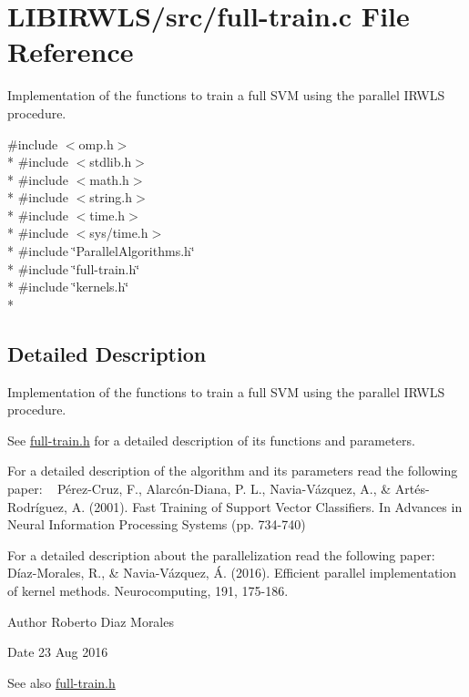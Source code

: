 \hypertarget{full-train_8c}{}\section{L\+I\+B\+I\+R\+W\+L\+S/src/full-\/train.c File Reference}
\label{full-train_8c}


Implementation of the functions to train a full S\+VM using the parallel I\+R\+W\+LS procedure.  


{\ttfamily \#include $<$omp.\+h$>$}\\*
{\ttfamily \#include $<$stdlib.\+h$>$}\\*
{\ttfamily \#include $<$math.\+h$>$}\\*
{\ttfamily \#include $<$string.\+h$>$}\\*
{\ttfamily \#include $<$time.\+h$>$}\\*
{\ttfamily \#include $<$sys/time.\+h$>$}\\*
{\ttfamily \#include \char`\"{}Parallel\+Algorithms.\+h\char`\"{}}\\*
{\ttfamily \#include \char`\"{}full-\/train.\+h\char`\"{}}\\*
{\ttfamily \#include \char`\"{}kernels.\+h\char`\"{}}\\*


\subsection{Detailed Description}
Implementation of the functions to train a full S\+VM using the parallel I\+R\+W\+LS procedure. 

See \hyperlink{full-train_8h}{full-\/train.\+h} for a detailed description of its functions and parameters.

For a detailed description of the algorithm and its parameters read the following paper\+: ~\newline
 Pérez-\/\+Cruz, F., Alarcón-\/\+Diana, P. L., Navia-\/\+Vázquez, A., \& Artés-\/\+Rodríguez, A. (2001). Fast Training of Support Vector Classifiers. In Advances in Neural Information Processing Systems (pp. 734-\/740)

For a detailed description about the parallelization read the following paper\+: ~\newline
Díaz-\/\+Morales, R., \& Navia-\/\+Vázquez, Á. (2016). Efficient parallel implementation of kernel methods. Neurocomputing, 191, 175-\/186.

\begin{DoxyAuthor}{Author}
Roberto Diaz Morales 
\end{DoxyAuthor}
\begin{DoxyDate}{Date}
23 Aug 2016 
\end{DoxyDate}
\begin{DoxySeeAlso}{See also}
\hyperlink{full-train_8h}{full-\/train.\+h} 
\end{DoxySeeAlso}
